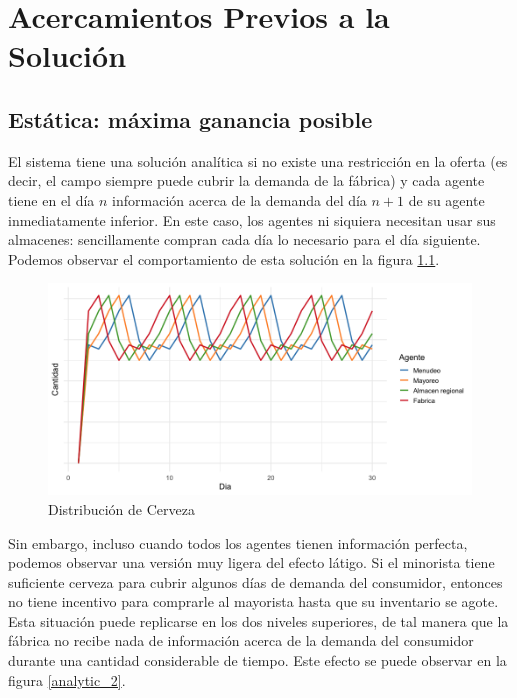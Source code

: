 \chapter{Acercamientos Previos a la Soluci\'on}

\section{Est\'atica: m\'axima ganancia posible}

El sistema tiene una soluci\'on anal\'itica si no existe una restricci\'on en la oferta (es decir, el campo siempre puede cubrir la demanda de la f\'abrica) y cada agente tiene en el d\'ia $n$ informaci\'on acerca de la demanda del d\'ia $n+1$ de su agente inmediatamente inferior. En este caso, los agentes ni siquiera necesitan usar sus almacenes: sencillamente compran cada d\'ia lo necesario para el d\'ia siguiente. Podemos observar el comportamiento de esta soluci\'on en la figura \ref{analytic_1}.

\begin{figure}[ht!]
\caption{Distribuci\'on de Cerveza}
\label{analytic_1}
\includegraphics[width=12cm]{tesis_tex/figs/analytic_solution_0_all_0_inv.png}
\centering
\end{figure}

Sin embargo, incluso cuando todos los agentes tienen informaci\'on perfecta, podemos observar una versi\'on muy ligera del efecto l\'atigo. Si el minorista tiene suficiente cerveza para cubrir algunos d\'ias de demanda del consumidor, entonces no tiene incentivo para comprarle al mayorista hasta que su inventario se agote. Esta situaci\'on puede replicarse en los dos niveles superiores, de tal manera que la f\'abrica no recibe nada de informaci\'on acerca de la demanda del consumidor durante una cantidad considerable de tiempo. Este efecto se puede observar en la figura \ref{analytic_2}.

